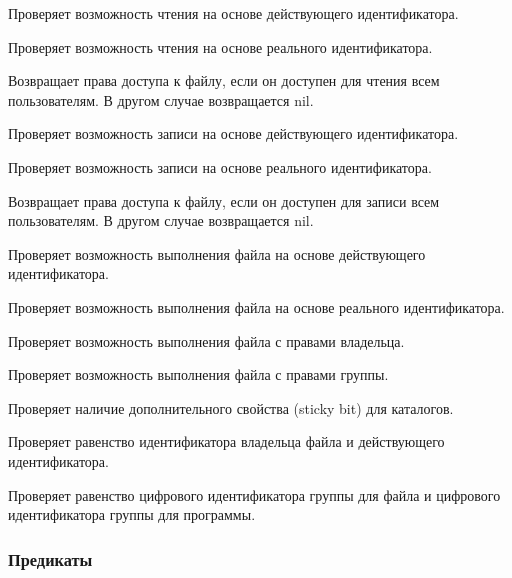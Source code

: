 \begin{methodlist}
  Проверяет возможность чтения на основе действующего идентификатора. 

  Проверяет возможность чтения на основе реального идентификатора.

  Возвращает права доступа к файлу, если он доступен для чтения всем пользователям. В другом случае возвращается nil. 

  Проверяет возможность записи на основе действующего идентификатора. 

  Проверяет возможность записи на основе реального идентификатора. 

  Возвращает права доступа к файлу, если он доступен для записи всем пользователям. В другом случае возвращается nil. 

  Проверяет возможность выполнения файла на основе действующего идентификатора.

  Проверяет возможность выполнения файла на основе реального идентификатора.

  Проверяет возможность выполнения файла с правами владельца. 

  Проверяет возможность выполнения файла с правами группы. 

  Проверяет наличие дополнительного свойства (sticky bit) для каталогов. 

  Проверяет равенство идентификатора владельца файла и действующего идентификатора. 

  Проверяет равенство цифрового идентификатора группы для файла и цифрового идентификатора группы для программы.
\end{methodlist}

\subsubsection*{Предикаты}

